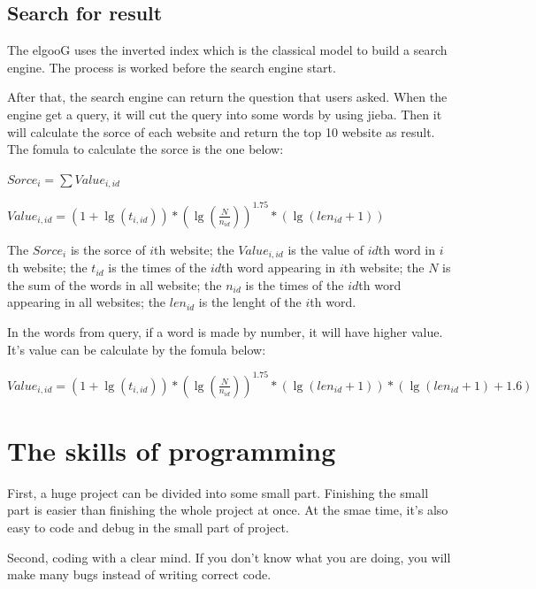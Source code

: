 \documentclass[a4paper]{article}
\begin{document}
	\subsection{Search for result}
	
		The elgooG uses the inverted index which is the classical model to build a search engine. The process is worked before the search engine start.
		
		After that, the search engine can return the question that users asked. When the engine get a query, it will cut the query into some words by using jieba. Then it will calculate the sorce of each website and return the top 10 website as result. The fomula to calculate the sorce is the one below:
		
		\begin{center}
			
			$Sorce_i = \sum{Value_{i,id}}$
			
			$Value_{i,id} = (1 + \lg(t_{i,id})) * (\lg(\frac{N}{n_{id}}))^{1.75} * (\lg(len_{id}+1))$
			
		\end{center}
		
		The $Sorce_i$ is the sorce of $i$th website; the $Value_{i,id}$ is the value of $id$th word in $i$th website; the $t_{id}$ is the times of the $id$th word appearing in $i$th website; the $N$ is the sum of the words in all website; the $n_{id}$ is the times of the $id$th word appearing in all websites; the $len_{id}$ is the lenght of the $i$th word.
		
		In the words from query, if a word is made by number, it will have higher value. It's value can be calculate by the fomula below:
		
		\begin{center}
			$Value_{i,id} = (1 + \lg(t_{i,id})) * (\lg(\frac{N}{n_{id}}))^{1.75} * (\lg(len_{id}+1)) * (\lg(len_{id} + 1) + 1.6) $
		\end{center}

\section{The skills of programming}
	
	First, a huge project can be divided into some small part. Finishing the small part is easier than finishing the whole project at once. At the smae time, it's also easy to code and debug in the small part of project.
	
	Second, coding with a clear mind. If you don't know what you are doing, you will make many bugs instead of writing correct code.
	
\end{document}
